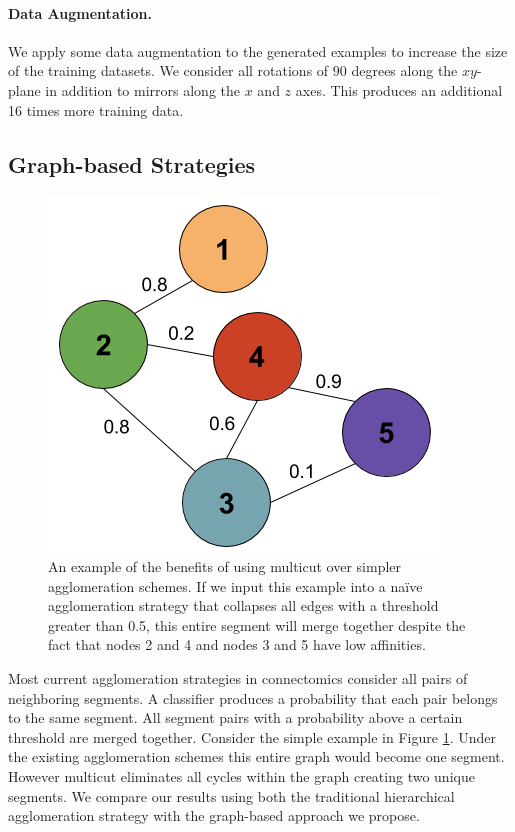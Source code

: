 \paragraph{Data Augmentation.}
We apply some data augmentation to the generated examples to increase the size of the training datasets. 
We consider all rotations of $90$ degrees along the $xy$-plane in addition to mirrors along the $x$ and $z$ axes. 
This produces an additional 16 times more training data. 

\subsection{Graph-based Strategies}

\begin{figure}
	\centering
	\includegraphics[width=0.8\linewidth]{./figures/multicut.png}
	\caption{An example of the benefits of using multicut over simpler agglomeration schemes. If we input this example into a na\"ive agglomeration strategy that collapses all edges with a threshold greater than 0.5, this entire segment will merge together despite the fact that nodes 2 and 4 and nodes 3 and 5 have low affinities.}
	\label{fig:multicut}
\end{figure}

Most current agglomeration strategies in connectomics consider all pairs of neighboring segments. A classifier produces a probability that each pair belongs to the same segment. All segment pairs with a probability above a certain threshold are merged together. Consider the simple example in Figure \ref{fig:multicut}. Under the existing agglomeration schemes this entire graph would become one segment. However multicut eliminates all cycles within the graph creating two unique segments. We compare our results using both the traditional hierarchical agglomeration strategy with the graph-based approach we propose. 

